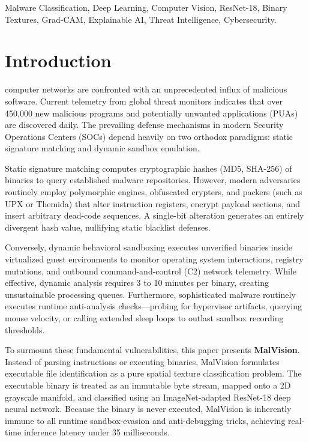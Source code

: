 \documentclass[journal,10pt,twocolumn]{IEEEtran}
\begin{document}
\begin{IEEEkeywords}
Malware Classification, Deep Learning, Computer Vision, ResNet-18, Binary Textures, Grad-CAM, Explainable AI, Threat Intelligence, Cybersecurity.
\end{IEEEkeywords}

\section{Introduction}
 computer networks are confronted with an unprecedented influx of malicious software. Current telemetry from global threat monitors indicates that over 450,000 new malicious programs and potentially unwanted applications (PUAs) are discovered daily. The prevailing defense mechanisms in modern Security Operations Centers (SOCs) depend heavily on two orthodox paradigms: static signature matching and dynamic sandbox emulation.

Static signature matching computes cryptographic hashes (MD5, SHA-256) of binaries to query established malware repositories. However, modern adversaries routinely employ polymorphic engines, obfuscated crypters, and packers (such as UPX or Themida) that alter instruction registers, encrypt payload sections, and insert arbitrary dead-code sequences. A single-bit alteration generates an entirely divergent hash value, nullifying static blacklist defenses. 

Conversely, dynamic behavioral sandboxing executes unverified binaries inside virtualized guest environments to monitor operating system interactions, registry mutations, and outbound command-and-control (C2) network telemetry. While effective, dynamic analysis requires 3 to 10 minutes per binary, creating unsustainable processing queues. Furthermore, sophisticated malware routinely executes runtime anti-analysis checks---probing for hypervisor artifacts, querying mouse velocity, or calling extended sleep loops to outlast sandbox recording thresholds.

To surmount these fundamental vulnerabilities, this paper presents \textbf{MalVision}. Instead of parsing instructions or executing binaries, MalVision formulates executable file identification as a pure spatial texture classification problem. The executable binary is treated as an immutable byte stream, mapped onto a 2D grayscale manifold, and classified using an ImageNet-adapted ResNet-18 deep neural network. Because the binary is never executed, MalVision is inherently immune to all runtime sandbox-evasion and anti-debugging tricks, achieving real-time inference latency under 35 milliseconds.
\end{document}
